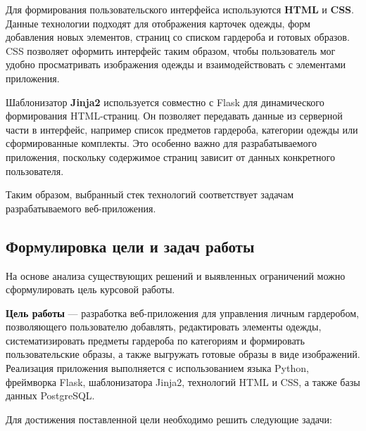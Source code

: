 Для формирования пользовательского интерфейса используются \textbf{HTML} и \textbf{CSS}. Данные технологии подходят для отображения карточек одежды, форм добавления новых элементов, страниц со списком гардероба и готовых образов. CSS позволяет оформить интерфейс таким образом, чтобы пользователь мог удобно просматривать изображения одежды и взаимодействовать с элементами приложения.

Шаблонизатор \textbf{Jinja2} используется совместно с Flask для динамического формирования HTML-страниц. Он позволяет передавать данные из серверной части в интерфейс, например список предметов гардероба, категории одежды или сформированные комплекты. Это особенно важно для разрабатываемого приложения, поскольку содержимое страниц зависит от данных конкретного пользователя.

Таким образом, выбранный стек технологий соответствует задачам разрабатываемого веб-приложения.

\subsection{Формулировка цели и задач работы}

На основе анализа существующих решений и выявленных ограничений можно сформулировать цель курсовой работы.

\textbf{Цель работы} --- разработка веб-приложения для управления личным гардеробом, позволяющего пользователю добавлять, редактировать элементы одежды, систематизировать предметы гардероба по категориям и формировать пользовательские образы, а также выгружать готовые образы в виде изображений. Реализация приложения выполняется с использованием языка Python, фреймворка Flask, шаблонизатора Jinja2, технологий HTML и CSS, а также базы данных PostgreSQL.

Для достижения поставленной цели необходимо решить следующие задачи:

